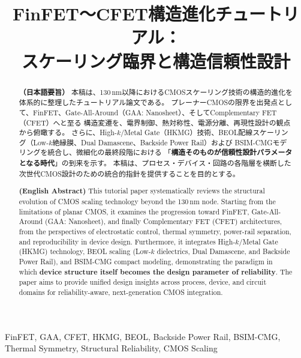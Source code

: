\documentclass[conference]{IEEEtran}
\title{FinFET〜CFET構造進化チュートリアル：\\
スケーリング臨界と構造信頼性設計}
\author{%
  \IEEEauthorblockN{三溝 真一 (Shinichi Samizo)}%
  \IEEEauthorblockA{独立系半導体研究者（元セイコーエプソン） / Independent Semiconductor Researcher (ex-Seiko Epson)\\%
  Email: \href{mailto:shin3t72@gmail.com}{shin3t72@gmail.com}\quad
  GitHub: \url{https://github.com/Samizo-AITL}}%
}
\begin{document}
\maketitle

\begin{abstract}
\textbf{（日本語要旨）}  
本稿は、130\,nm以降におけるCMOSスケーリング技術の構造的進化を体系的に整理したチュートリアル論文である。  
プレーナーCMOSの限界を出発点として、FinFET、Gate-All-Around（GAA: Nanosheet）、そしてComplementary FET（CFET）へと至る  
構造変遷を、電界制御、熱対称性、電源分離、再現性設計の観点から俯瞰する。  
さらに、High-$k$/Metal Gate（HKMG）技術、BEOL配線スケーリング（Low-$k$絶縁膜、Dual Damascene、Backside Power Rail）および  
BSIM-CMGモデリングを統合し、微細化の最終段階における  
「\textbf{構造そのものが信頼性設計パラメータとなる時代}」の到来を示す。  
本稿は、プロセス・デバイス・回路の各階層を横断した次世代CMOS設計のための統合的指針を提供することを目的とする。  

\medskip
\textbf{(English Abstract)}  
This tutorial paper systematically reviews the structural evolution of CMOS scaling technology beyond the 130\,nm node.  
Starting from the limitations of planar CMOS, it examines the progression toward FinFET, Gate-All-Around (GAA: Nanosheet),  
and finally Complementary FET (CFET) architectures, from the perspectives of electrostatic control, thermal symmetry,  
power-rail separation, and reproducibility in device design.  
Furthermore, it integrates High-$k$/Metal Gate (HKMG) technology, BEOL scaling  
(Low-$k$ dielectrics, Dual Damascene, and Backside Power Rail), and BSIM-CMG compact modeling,  
demonstrating the paradigm in which \textbf{device structure itself becomes the design parameter of reliability}.  
The paper aims to provide unified design insights across process, device, and circuit domains  
for reliability-aware, next-generation CMOS integration.
\end{abstract}

\begin{IEEEkeywords}
FinFET, GAA, CFET, HKMG, BEOL, Backside Power Rail, BSIM-CMG, Thermal Symmetry, Structural Reliability, CMOS Scaling
\end{IEEEkeywords}












\end{document}
